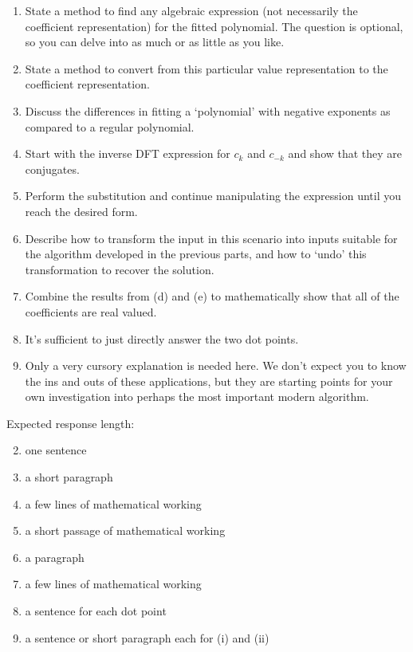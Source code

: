 \documentclass{article}
\begin{document}
\begin{rubric}
\begin{enumerate}
    \item State a method to find any algebraic expression (not necessarily the coefficient representation) for the fitted polynomial. The question is optional, so you can delve into as much or as little as you like.
    \item State a method to convert from this particular value representation to the coefficient representation.
    \item Discuss the differences in fitting a `polynomial' with negative exponents as compared to a regular polynomial.
    \item Start with the inverse DFT expression for $c_k$ and $c_{-k}$ and show that they are conjugates.
    \item Perform the substitution and continue manipulating the expression until you reach the desired form.
    \item Describe how to transform the input in this scenario into inputs suitable for the algorithm developed in the previous parts, and how to `undo' this transformation to recover the solution.
    \item Combine the results from (d) and (e) to mathematically show that all of the coefficients are real valued.
    \item It's sufficient to just directly answer the two dot points.
    \item Only a very cursory explanation is needed here. We don't expect you to know the ins and outs of these applications, but they are starting points for your own investigation into perhaps the most important modern algorithm.
\end{enumerate}

Expected response length:
\begin{enumerate}
    \setcounter{enumi}{1}
    \item one sentence
    \item a short paragraph
    \item a few lines of mathematical working
    \item a short passage of mathematical working
    \item a paragraph
    \item a few lines of mathematical working
    \item a sentence for each dot point
    \item a sentence or short paragraph each for (i) and (ii)
\end{enumerate}
\end{rubric}
\end{document}
